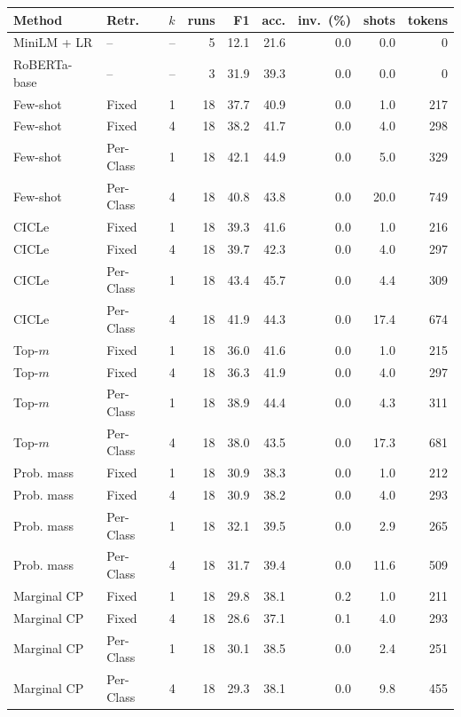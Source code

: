 \begin{tabular}{llrrrrrrr}
\toprule
Method & Retr. & $k$ & runs & F1 & acc. & inv.\ (\%) & shots & tokens \\
\midrule
MiniLM + LR & -- & -- & 5 & 12.1 & 21.6 & 0.0 & 0.0 & 0 \\
RoBERTa-base & -- & -- & 3 & 31.9 & 39.3 & 0.0 & 0.0 & 0 \\
\midrule
Few-shot & Fixed & 1 & 18 & 37.7 & 40.9 & 0.0 & 1.0 & 217 \\
Few-shot & Fixed & 4 & 18 & 38.2 & 41.7 & 0.0 & 4.0 & 298 \\
Few-shot & Per-Class & 1 & 18 & 42.1 & 44.9 & 0.0 & 5.0 & 329 \\
Few-shot & Per-Class & 4 & 18 & 40.8 & 43.8 & 0.0 & 20.0 & 749 \\
CICLe & Fixed & 1 & 18 & 39.3 & 41.6 & 0.0 & 1.0 & 216 \\
CICLe & Fixed & 4 & 18 & 39.7 & 42.3 & 0.0 & 4.0 & 297 \\
CICLe & Per-Class & 1 & 18 & 43.4 & 45.7 & 0.0 & 4.4 & 309 \\
CICLe & Per-Class & 4 & 18 & 41.9 & 44.3 & 0.0 & 17.4 & 674 \\
\midrule
Top-$m$ & Fixed & 1 & 18 & 36.0 & 41.6 & 0.0 & 1.0 & 215 \\
Top-$m$ & Fixed & 4 & 18 & 36.3 & 41.9 & 0.0 & 4.0 & 297 \\
Top-$m$ & Per-Class & 1 & 18 & 38.9 & 44.4 & 0.0 & 4.3 & 311 \\
Top-$m$ & Per-Class & 4 & 18 & 38.0 & 43.5 & 0.0 & 17.3 & 681 \\
Prob. mass & Fixed & 1 & 18 & 30.9 & 38.3 & 0.0 & 1.0 & 212 \\
Prob. mass & Fixed & 4 & 18 & 30.9 & 38.2 & 0.0 & 4.0 & 293 \\
Prob. mass & Per-Class & 1 & 18 & 32.1 & 39.5 & 0.0 & 2.9 & 265 \\
Prob. mass & Per-Class & 4 & 18 & 31.7 & 39.4 & 0.0 & 11.6 & 509 \\
Marginal CP & Fixed & 1 & 18 & 29.8 & 38.1 & 0.2 & 1.0 & 211 \\
Marginal CP & Fixed & 4 & 18 & 28.6 & 37.1 & 0.1 & 4.0 & 293 \\
Marginal CP & Per-Class & 1 & 18 & 30.1 & 38.5 & 0.0 & 2.4 & 251 \\
Marginal CP & Per-Class & 4 & 18 & 29.3 & 38.1 & 0.0 & 9.8 & 455 \\

\end{tabular}
